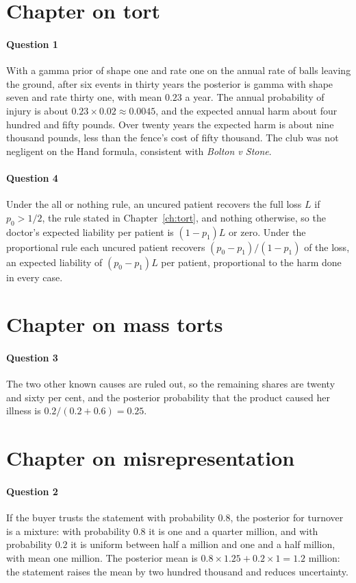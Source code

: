 \section*{Chapter on tort}
\paragraph{Question 1} With a gamma prior of shape one and rate one on the annual rate of balls leaving the ground, after six events in thirty years the posterior is gamma with shape seven and rate thirty one, with mean $0.23$ a year. The annual probability of injury is about $0.23\times 0.02\approx 0.0045$, and the expected annual harm about four hundred and fifty pounds. Over twenty years the expected harm is about nine thousand pounds, less than the fence's cost of fifty thousand. The club was not negligent on the Hand formula, consistent with \emph{Bolton v Stone}.
\paragraph{Question 4} Under the all or nothing rule, an uncured patient recovers the full loss $L$ if $p_0 > 1/2$, the rule stated in Chapter~\ref{ch:tort}, and nothing otherwise, so the doctor's expected liability per patient is $(1 - p_1)L$ or zero. Under the proportional rule each uncured patient recovers $(p_0 - p_1)/(1 - p_1)$ of the loss, an expected liability of $(p_0 - p_1)L$ per patient, proportional to the harm done in every case.

\section*{Chapter on mass torts}
\paragraph{Question 3} The two other known causes are ruled out, so the remaining shares are twenty and sixty per cent, and the posterior probability that the product caused her illness is $0.2/(0.2+0.6) = 0.25$.

\section*{Chapter on misrepresentation}
\paragraph{Question 2} If the buyer trusts the statement with probability $0.8$, the posterior for turnover is a mixture: with probability $0.8$ it is one and a quarter million, and with probability $0.2$ it is uniform between half a million and one and a half million, with mean one million. The posterior mean is $0.8\times 1.25 + 0.2\times 1 = 1.2$ million: the statement raises the mean by two hundred thousand and reduces uncertainty.
